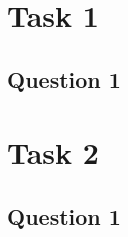 \documentclass[12pt]{article} %
\begin{document}
\section{Task 1} %


\subsection{Question 1} %



\section{Task 2} %


\subsection{Question 1} %





\begin{thebibliography}{99} %

 
\end{thebibliography}
\end{document}
